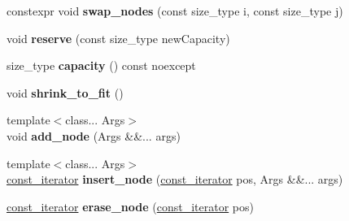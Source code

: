 \begin{DoxyCompactItemize}
\item 
\mbox{\label{classsequoia_1_1maths_1_1graph__impl_1_1node__storage_a15adb8537eb4bf4dbe91c216d7d5ac9d}} 
constexpr void {\bfseries swap\+\_\+nodes} (const size\+\_\+type i, const size\+\_\+type j)
\item 
\mbox{\label{classsequoia_1_1maths_1_1graph__impl_1_1node__storage_a7a56022dbaa8a7b1b1d428abd8f531a0}} 
void {\bfseries reserve} (const size\+\_\+type new\+Capacity)
\item 
\mbox{\label{classsequoia_1_1maths_1_1graph__impl_1_1node__storage_a8dc2a17dc6780f8a121668c593698bda}} 
size\+\_\+type {\bfseries capacity} () const noexcept
\item 
\mbox{\label{classsequoia_1_1maths_1_1graph__impl_1_1node__storage_a722ea1eed23dc367d162c0da2b0738f2}} 
void {\bfseries shrink\+\_\+to\+\_\+fit} ()
\item 
\mbox{\label{classsequoia_1_1maths_1_1graph__impl_1_1node__storage_aeb39ef54e131596430d9c96b509fcbe1}} 
{\footnotesize template$<$class... Args$>$ }\\void {\bfseries add\+\_\+node} (Args \&\&... args)
\item 
\mbox{\label{classsequoia_1_1maths_1_1graph__impl_1_1node__storage_a59473427a61fc7e96d1bc749c1409624}} 
{\footnotesize template$<$class... Args$>$ }\\\mbox{\hyperlink{classsequoia_1_1utilities_1_1iterator}{const\+\_\+iterator}} {\bfseries insert\+\_\+node} (\mbox{\hyperlink{classsequoia_1_1utilities_1_1iterator}{const\+\_\+iterator}} pos, Args \&\&... args)
\item 
\mbox{\label{classsequoia_1_1maths_1_1graph__impl_1_1node__storage_a4478a01ef346fdbef2054e98a1eef82f}} 
\mbox{\hyperlink{classsequoia_1_1utilities_1_1iterator}{const\+\_\+iterator}} {\bfseries erase\+\_\+node} (\mbox{\hyperlink{classsequoia_1_1utilities_1_1iterator}{const\+\_\+iterator}} pos)

\end{DoxyCompactItemize}
